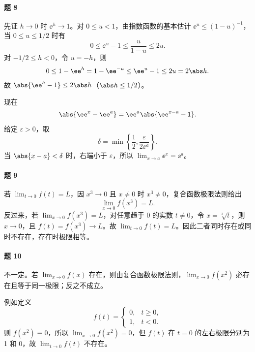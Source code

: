 \paragraph{题 8}
\begin{xsolution}
先证 $h\to0$ 时 $\ee^h\to1$。对 $0\leq u<1$，由指数函数的基本估计
$\ee^u\leq(1-u)^{-1}$，当 $0\leq u\leq1/2$ 时有
\[
  0\leq\ee^u-1\leq\frac{u}{1-u}\leq2u.
\]
对 $-1/2\leq h<0$，令 $u=-h$，则
\[
  0\leq1-\ee^h=1-\ee^{-u}\leq\ee^u-1\leq2u=2\abs h.
\]
故 $\abs{\ee^h-1}\leq2\abs h$（$\abs h\leq1/2$）。

现在
\[
  \abs{\ee^x-\ee^a}=\ee^a\abs{\ee^{x-a}-1}.
\]
给定 $\varepsilon>0$，取
\[
  \delta=\min\left\{\frac12,\frac{\varepsilon}{2\ee^a}\right\}.
\]
当 $\abs{x-a}<\delta$ 时，右端小于 $\varepsilon$，所以
$\lim_{x\to a}\ee^x=\ee^a$。
\end{xsolution}

\paragraph{题 9}
\begin{xsolution}
若 $\lim_{t\to0}f(t)=L$，因 $x^3\to0$ 且 $x\ne0$ 时 $x^3\ne0$，复合函数极限法则给出
\[
  \lim_{x\to0}f(x^3)=L.
\]
反过来，若 $\lim_{x\to0}f(x^3)=L$，对任意趋于 0 的实数 $t\ne0$，令 $x=\sqrt[3]t$，则 $x\to0$，且
$f(t)=f(x^3)\to L$。故 $\lim_{t\to0}f(t)=L$。因此二者同时存在或同时不存在，存在时极限相等。
\end{xsolution}

\paragraph{题 10}
\begin{xsolution}
不一定。若 $\lim_{x\to0}f(x)$ 存在，则由复合函数极限法则，$\lim_{x\to0}f(x^2)$ 必存在且等于同一极限；反之不成立。

例如定义
\[
  f(t)=\begin{cases}
    0,&t\geq0,\\
    1,&t<0.
  \end{cases}
\]
则 $f(x^2)\equiv0$，所以 $\lim_{x\to0}f(x^2)=0$，但 $f(t)$ 在 $t=0$ 的左右极限分别为 1 和 0，故 $\lim_{t\to0}f(t)$ 不存在。
\end{xsolution}

